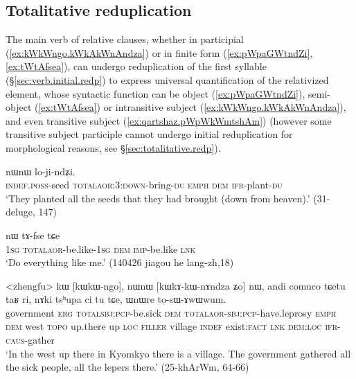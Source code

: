 \subsection{Totalitative reduplication} \label{sec:totalitative.relatives}
The main verb of relative clauses, whether in participial (\ref{ex:kWkWngo.kWkAkWnAndza}) or in finite form (\ref{ex:pWpaGWtndZi}, \ref{ex:tWtAfsea}), can undergo reduplication of the first syllable (§\ref{sec:verb.initial.redp}) to express universal quantification of the relativized element, whose syntactic function can be object (\ref{ex:pWpaGWtndZi}), semi-object (\ref{ex:tWtAfsea}) or intransitive subject (\ref{ex:kWkWngo.kWkAkWnAndza}), and even transitive subject (\ref{ex:qartshaz.pWpWkWmtshAm}) (however some transitive subject participle cannot undergo initial reduplication for morphological reasons, see §\ref{sec:totalitative.redp}).

\begin{exe}
\ex \label{ex:pWpaGWtndZi}
 nɯnɯ lo-ji-ndʑi. \\
\textsc{indef}.\textsc{poss}-seed \textsc{total}\redp{}\textsc{aor}:3\flobv{}:\textsc{down}-bring-\textsc{du} \textsc{emph} \textsc{dem} \textsc{ifr}-plant-\textsc{du} \\
\glt `They planted all the seeds that they had brought (down from heaven).' (31-deluge, 147)
\end{exe}
  

\begin{exe}
\ex \label{ex:tWtAfsea}
 nɯ tɤ-fse tɕe \\
\textsc{1sg} \textsc{total}\redp{}\textsc{aor}-be.like-\textsc{1sg} \textsc{dem} \textsc{imp}-be.like \textsc{lnk} \\
\glt `Do everything like me.' (140426 jiagou he lang-zh,18)
\end{exe}

\begin{exe}
\ex \label{ex:kWkWngo.kWkAkWnAndza}
\gll <zhengfu> kɯ [kɯ\redp{}kɯ-ngo], nɯnɯ [kɯ\redp{}kɤ-kɯ-nɤndza ʑo] nɯ, andi comuco tɕetu taʁ ri, nɤki tsʰupa ci tu tɕe, ɯnɯre to-sɯ-ɤwɯwum. \\
government \textsc{erg} \textsc{total}\redp{}\textsc{sbj}:\textsc{pcp}-be.sick \textsc{dem} \textsc{total}\redp{}\textsc{aor}-\textsc{sbj}:\textsc{pcp}-have.leprosy \textsc{emph} \textsc{dem} west  \textsc{topo} up.there up \textsc{loc} \textsc{filler} village \textsc{indef} exist:\textsc{fact} \textsc{lnk} \textsc{dem}:\textsc{loc} \textsc{ifr}-\textsc{caus}-gather \\
\glt `In the west up there in Kyomkyo there is a village. The government gathered all the sick people, all the lepers there.' (25-khArWm, 64-66)
\end{exe}

